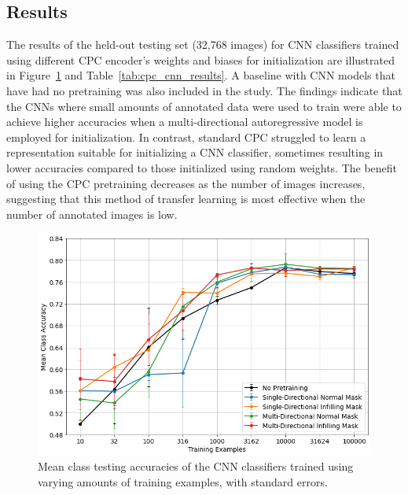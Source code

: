 \subsection{Results}
\label{subsec:unsupervised_results}
The results of the held-out testing set (32,768 images) for CNN classifiers trained using different CPC encoder's weights and biases for initialization are illustrated in Figure~\ref{fig:cpc_cnn_results} and Table~\ref{tab:cpc_cnn_results}. A baseline with CNN models that have had no pretraining was also included in the study. The findings indicate that the CNNs where small amounts of annotated data were used to train were able to achieve higher accuracies when a multi-directional autoregressive model is employed for initialization. In contrast, standard CPC struggled to learn a representation suitable for initializing a CNN classifier, sometimes resulting in lower accuracies compared to those initialized using random weights. The benefit of using the CPC pretraining decreases as the number of images increases, suggesting that this method of transfer learning is most effective when the number of annotated images is low.

\begin{figure}[h]
	\centering
	\includegraphics[width=\textwidth]{images/cpc_cnn_results.png}
	\caption{Mean class testing accuracies of the CNN classifiers trained using varying amounts of training examples, with standard errors.}
	\label{fig:cpc_cnn_results}
\end{figure}

